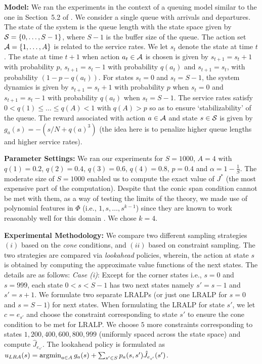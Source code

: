 \documentclass[12pt,draftcls,onecolumn]{IEEEtran}
\begin{document}
\textbf{Model:} We ran the experiments in the context of a queuing model similar to the one in Section~5.2 of \cite{ALP}. We consider a single queue with arrivals and departures. The state of the system is the queue length with the state space given by $\S=\{0,\ldots,S-1\}$, where $S-1$ is the buffer size of the queue. The action set $\A=\{1,\ldots,A\}$ is related to the service rates. We let $s_t$ denote the state at time $t$. The state at time $t+1$ when action $a_t \in \A$ is chosen is given by $s_{t+1}= s_{t}+1$ with probability $p$, $s_{t+1}= s_{t}-1$ with probability $q(a_t)$ and $s_{t+1}= s_t$, with probability $(1-p-q(a_t))$. For states $s_t=0$ and $s_t=S-1$, the system dynamics is given by $s_{t+1}= s_{t}+1$ with probability $p$ when $s_t=0$ and $s_{t+1}=s_t-1$ with probability $q(a_t)$ when $s_t=S-1$. The service rates satisfy $0<q(1)\leq \ldots\leq q(A)<1$ with $q(A)>p$ so as to ensure `stabilizability' of the queue.
The reward associated with  action $a \in \A$ and state $s\in \S$ is given by $g_a(s)=-(s/N+q(a)^3)$ (the idea here is to penalize higher queue lengths and higher service rates).

\textbf{Parameter Settings:} We ran our experiments for $S=1000$, $A=4$ with $q(1)=0.2$, $q(2)=0.4$, $q(3)=0.6$, $q(4)=0.8$, $p=0.4$ and $\alpha=1-\frac{1}{S}$.
The moderate size of $S=1000$ enabled us to compute the exact value of $J^*$ (the most expensive part of the computation).
Despite that the conic span condition cannot be met with them, as a way of testing the limits of the theory,
we made use of polynomial features in $\Phi$ (i.e., $1,s,\ldots,s^{k-1}$)
since they are known to work reasonably well for this domain \cite{ALP}.
We chose $k=4$. %

\textbf{Experimental Methodology:} We compare two different sampling strategies $(i)$ based on the \emph{cone} conditions, and $(ii)$ based on constraint sampling. The two strategies are compared via  \emph{lookahead} policies, wherein, the action at state $s$ is obtained by computing the approximate value functions of the next states. The details are as follows:
\emph{Case (i)}: Except for the corner states i.e., $s=0$ and $s=999$, each state $0<s<S-1$ has two next states namely $s'=s-1$ and $s'=s+1$. We formulate two separate LRALPs (or just one LRALP for $s=0$ and $s=S-1$) for next states. When formulating the LRALP for state $s'$, we let $c=e_{s'}$ and choose the constraint corresponding to state $s'$ to ensure the cone condition to be met for LRALP. We choose $5$ more constraints corresponding to states $1,200,400,600,800,999$ (uniformly spaced across the state space) and compute $\hat{J}_{e_{s'}}$. The lookahead policy is formulated as
$u_{LRA}(s)=\argmin_{a\in A} g_a(s)+\sum_{s'\in S}p_a(s,s')\hat{J}_{e_{s'}}(s')$.
\end{document}
